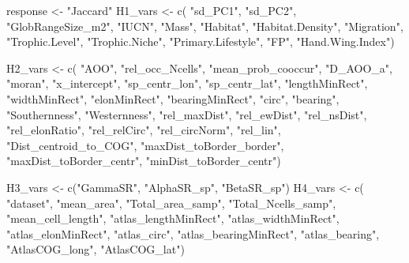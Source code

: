 \documentclass[
  letterpaper,
  DIV=11,
  numbers=noendperiod]{scrartcl}
\newenvironment{Shaded}{\begin{snugshade}}{\end{snugshade}}
\newcommand{\FunctionTok}[1]{\textcolor[rgb]{0.28,0.35,0.67}{#1}}
\newcommand{\NormalTok}[1]{\textcolor[rgb]{0.00,0.23,0.31}{#1}}
\newcommand{\OtherTok}[1]{\textcolor[rgb]{0.00,0.23,0.31}{#1}}
\newcommand{\StringTok}[1]{\textcolor[rgb]{0.13,0.47,0.30}{#1}}
\begin{document}
\begin{Shaded}
\begin{Highlighting}[]
\NormalTok{response }\OtherTok{\textless{}{-}} \StringTok{"Jaccard"}
\NormalTok{H1\_vars }\OtherTok{\textless{}{-}} \FunctionTok{c}\NormalTok{(}
    \StringTok{"sd\_PC1"}\NormalTok{, }\StringTok{"sd\_PC2"}\NormalTok{,}
    \StringTok{"GlobRangeSize\_m2"}\NormalTok{, }\StringTok{"IUCN"}\NormalTok{, }\StringTok{"Mass"}\NormalTok{, }\StringTok{"Habitat"}\NormalTok{, }\StringTok{"Habitat.Density"}\NormalTok{,}
    \StringTok{"Migration"}\NormalTok{, }\StringTok{"Trophic.Level"}\NormalTok{, }\StringTok{"Trophic.Niche"}\NormalTok{, }\StringTok{"Primary.Lifestyle"}\NormalTok{,}
    \StringTok{"FP"}\NormalTok{, }\StringTok{"Hand.Wing.Index"}\NormalTok{)}

\NormalTok{H2\_vars }\OtherTok{\textless{}{-}} \FunctionTok{c}\NormalTok{(}
    \StringTok{"AOO"}\NormalTok{, }\StringTok{"rel\_occ\_Ncells"}\NormalTok{, }\StringTok{"mean\_prob\_cooccur"}\NormalTok{, }\StringTok{"D\_AOO\_a"}\NormalTok{, }
    \StringTok{"moran"}\NormalTok{, }\StringTok{"x\_intercept"}\NormalTok{, }\StringTok{"sp\_centr\_lon"}\NormalTok{, }\StringTok{"sp\_centr\_lat"}\NormalTok{,}
    \StringTok{"lengthMinRect"}\NormalTok{, }\StringTok{"widthMinRect"}\NormalTok{, }\StringTok{"elonMinRect"}\NormalTok{, }\StringTok{"bearingMinRect"}\NormalTok{,}
    \StringTok{"circ"}\NormalTok{, }\StringTok{"bearing"}\NormalTok{, }\StringTok{"Southernness"}\NormalTok{, }\StringTok{"Westernness"}\NormalTok{,}
    \StringTok{"rel\_maxDist"}\NormalTok{, }\StringTok{"rel\_ewDist"}\NormalTok{, }\StringTok{"rel\_nsDist"}\NormalTok{, }\StringTok{"rel\_elonRatio"}\NormalTok{,}
    \StringTok{"rel\_relCirc"}\NormalTok{, }\StringTok{"rel\_circNorm"}\NormalTok{, }\StringTok{"rel\_lin"}\NormalTok{, }\StringTok{"Dist\_centroid\_to\_COG"}\NormalTok{,}
    \StringTok{"maxDist\_toBorder\_border"}\NormalTok{, }\StringTok{"maxDist\_toBorder\_centr"}\NormalTok{,}
    \StringTok{"minDist\_toBorder\_centr"}\NormalTok{)}

\NormalTok{H3\_vars }\OtherTok{\textless{}{-}} \FunctionTok{c}\NormalTok{(}\StringTok{"GammaSR"}\NormalTok{, }\StringTok{"AlphaSR\_sp"}\NormalTok{, }\StringTok{"BetaSR\_sp"}\NormalTok{)}
\NormalTok{H4\_vars }\OtherTok{\textless{}{-}} \FunctionTok{c}\NormalTok{(}
    \StringTok{"dataset"}\NormalTok{, }\StringTok{"mean\_area"}\NormalTok{, }\StringTok{"Total\_area\_samp"}\NormalTok{, }\StringTok{"Total\_Ncells\_samp"}\NormalTok{,}
    \StringTok{"mean\_cell\_length"}\NormalTok{, }\StringTok{"atlas\_lengthMinRect"}\NormalTok{, }\StringTok{"atlas\_widthMinRect"}\NormalTok{,}
    \StringTok{"atlas\_elonMinRect"}\NormalTok{, }\StringTok{"atlas\_circ"}\NormalTok{, }\StringTok{"atlas\_bearingMinRect"}\NormalTok{,}
    \StringTok{"atlas\_bearing"}\NormalTok{, }\StringTok{"AtlasCOG\_long"}\NormalTok{, }\StringTok{"AtlasCOG\_lat"}\NormalTok{)}
\end{Highlighting}
\end{Shaded}
\end{document}
